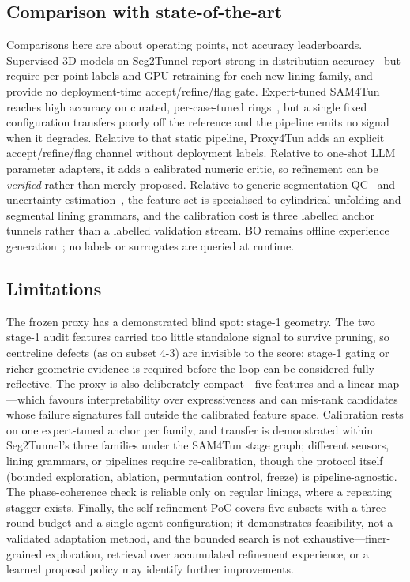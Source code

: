 \documentclass[a4paper,fleqn]{cas-dc}
\begin{document}
\subsection{Comparison with state-of-the-art}\label{sec:positioning}

Comparisons here are about operating points, not accuracy leaderboards. Supervised 3D models on Seg2Tunnel report strong in-distribution accuracy~\cite{lin2024seg2tunnel} but require per-point labels and GPU retraining for each new lining family, and provide no deployment-time accept/refine/flag gate. Expert-tuned SAM4Tun reaches high accuracy on curated, per-case-tuned rings~\cite{ye2025sam4tun}, but a single fixed configuration transfers poorly off the reference and the pipeline emits no signal when it degrades. Relative to that static pipeline, Proxy4Tun adds an explicit accept/refine/flag channel without deployment labels. Relative to one-shot LLM parameter adapters, it adds a calibrated numeric critic, so refinement can be \emph{verified} rather than merely proposed. Relative to generic segmentation QC~\cite{valindria2017rca,fournel2021segmentationQC} and uncertainty estimation~\cite{gal2016dropout,lakshminarayanan2017deepEnsembles}, the feature set is specialised to cylindrical unfolding and segmental lining grammars, and the calibration cost is three labelled anchor tunnels rather than a labelled validation stream. BO remains offline experience generation~\cite{snoek2012practicalBO,garnett2023bayesianOptimization}; no labels or surrogates are queried at runtime.

\subsection{Limitations}\label{sec:limitations}

The frozen proxy has a demonstrated blind spot: stage-1 geometry. The two stage-1 audit features carried too little standalone signal to survive pruning, so centreline defects (as on subset 4-3) are invisible to the score; stage-1 gating or richer geometric evidence is required before the loop can be considered fully reflective. The proxy is also deliberately compact---five features and a linear map---which favours interpretability over expressiveness and can mis-rank candidates whose failure signatures fall outside the calibrated feature space. Calibration rests on one expert-tuned anchor per family, and transfer is demonstrated within Seg2Tunnel's three families under the SAM4Tun stage graph; different sensors, lining grammars, or pipelines require re-calibration, though the protocol itself (bounded exploration, ablation, permutation control, freeze) is pipeline-agnostic. The phase-coherence check is reliable only on regular linings, where a repeating stagger exists. Finally, the self-refinement PoC covers five subsets with a three-round budget and a single agent configuration; it demonstrates feasibility, not a validated adaptation method, and the bounded search is not exhaustive---finer-grained exploration, retrieval over accumulated refinement experience, or a learned proposal policy may identify further improvements.
\end{document}
